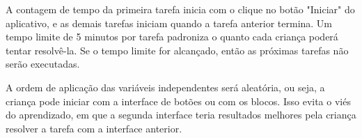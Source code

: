 A contagem de tempo da primeira tarefa inicia com o clique no botão "Iniciar" do aplicativo, e as demais tarefas iniciam quando a tarefa anterior termina. Um tempo limite de 5 minutos por tarefa padroniza o quanto cada criança poderá tentar resolvê-la. Se o tempo limite for alcançado, então as próximas tarefas não serão executadas.

A ordem de aplicação das variáveis independentes será aleatória, ou seja, a criança pode iniciar com a interface de botões ou com os blocos. Isso evita o viés do aprendizado, em que a segunda interface teria resultados melhores pela criança resolver a tarefa com a interface anterior.




